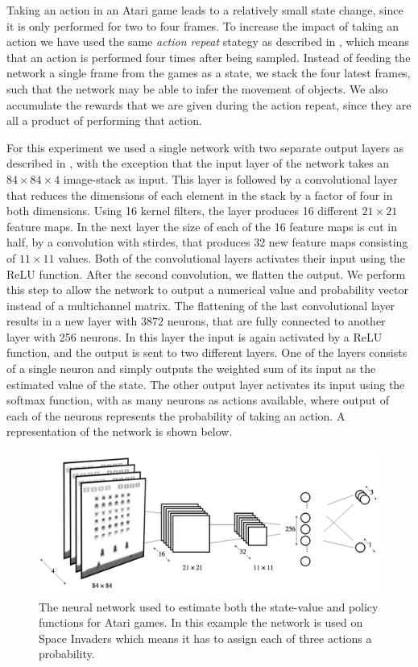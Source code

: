 \documentclass[11pt]{article}
\begin{document}
Taking an action in an Atari game leads to a relatively small state change,
since it is only performed for two to four frames.
To increase the impact of taking an action we have used the same \textit{action repeat}
stategy as described in \cite{a3c}, which means that an action is performed four times
after being sampled.
Instead of feeding the network a single frame from the games as a state,
we stack the four latest frames, such that the network may be able
to infer the movement of objects.
We also accumulate the rewards that we are given during the action repeat,
since they are all a product of performing that action.

For this experiment we used a single network with two separate
output layers as described in \cite{a3c}, with the exception that
the input layer of the network takes an $84 \times 84 \times 4$
image-stack as input.
This layer is followed by a convolutional layer that reduces the dimensions
of each element in the stack by a factor of four in both dimensions.
Using 16 kernel filters, the layer produces 16 different
$21 \times 21$ feature maps.
In the next layer the size of each of the 16 feature maps is
cut in half, by a convolution with stirdes, that produces 32 new feature maps consisting
of $11 \times 11$ values.
Both of the convolutional layers activates
their input using the ReLU function.
After the second convolution, we flatten the output.
We perform this step to allow the network to output a numerical value and
probability vector instead of a multichannel matrix.
The flattening of the last convolutional layer results in a new layer with $3872$ neurons,
that are fully connected to another layer with 256 neurons.
In this layer the input is again activated by a ReLU function,
and the output is sent to two different layers.
One of the layers consists of a single neuron
and simply outputs the weighted sum of its input as the estimated value
of the state.
The other output layer activates its input using the softmax function,
with as many neurons as actions available,
where output of each of the neurons represents the probability of taking an action.
A representation of the network is shown below.

\begin{figure}[H]
    \centering
    \includegraphics[scale=0.25]{include/Atari_network.png}
    \caption{The neural network used to estimate both the state-value
             and policy functions for Atari games. In this example the network
             is used on Space Invaders which means it has to assign each of three actions a probability.}
    \label{fig:atari_network}
\end{figure}
\end{document}
